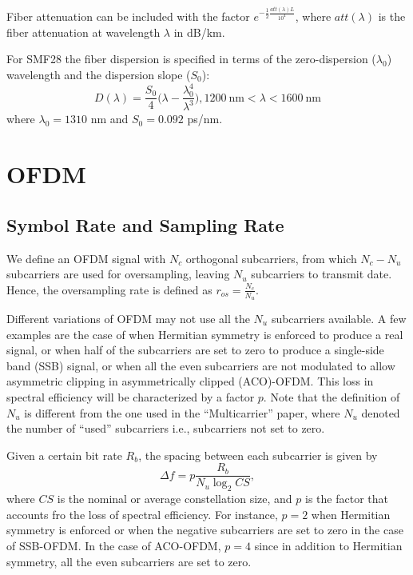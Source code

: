 \documentclass[a4paper]{article}
\begin{document}
Fiber attenuation can be included with the factor $e^{-\frac{1}{2}\frac{att(\lambda)L}{10^4}}$, where $att(\lambda)$ is the fiber attenuation at wavelength $\lambda$ in dB/km.

For SMF28 the fiber dispersion is specified in terms of the zero-dispersion ($\lambda_0$) wavelength and the dispersion slope ($S_0$):
\begin{equation}
D(\lambda) = \frac{S_0}{4}\bigg(\lambda - \frac{\lambda_0^4}{\lambda^3}\bigg), 1200~\text{nm} < \lambda < 1600~\text{nm}
\end{equation}
where $\lambda_0 = 1310$ nm and $S_0 = 0.092$ ps/nm.

\section{OFDM}

\subsection{Symbol Rate and Sampling Rate}

We define an OFDM signal with $N_c$ orthogonal subcarriers, from which $N_c - N_u$ subcarriers are used for oversampling, leaving $N_u$ subcarriers to transmit date. Hence, the oversampling rate is defined as $r_{os} = \frac{N_c}{N_u}$. 

Different variations of OFDM may not use all the $N_u$ subcarriers available. A few examples are the case of when Hermitian symmetry is enforced to produce a real signal, or when half of the subcarriers are set to zero to produce a single-side band (SSB) signal, or when all the even subcarriers are not modulated to allow asymmetric clipping in asymmetrically clipped (ACO)-OFDM. This loss in spectral efficiency will be characterized by a factor $p$. Note that the definition of $N_u$ is different from the one used in the ``Multicarrier'' paper, where $N_u$ denoted the number of ``used'' subcarriers i.e., subcarriers not set to zero. 

Given a certain bit rate $R_b$, the spacing between each subcarrier is given by
\begin{equation} \label{eq:ofdm-subcarrier-spacing}
\Delta f = p\frac{R_b}{N_u\log_2 CS},
\end{equation}
where $CS$ is the nominal or average constellation size, and $p$ is the factor that accounts fro the loss of spectral efficiency. For instance, $p = 2$ when Hermitian symmetry is enforced or when the negative subcarriers are set to zero in the case of SSB-OFDM. In the case of ACO-OFDM, $p = 4$ since in addition to Hermitian symmetry, all the even subcarriers are set to zero. 
\end{document}
